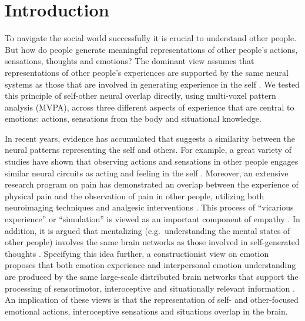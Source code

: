\documentclass[12pt,american,a4paper,oneside,]{memoir} %
\begin{document}
\hypertarget{Sharedstates-introduction}{%
\section{Introduction}\label{Sharedstates-introduction}}

To navigate the social world successfully it is crucial to understand other people. But how do people generate meaningful representations of other people's actions, sensations, thoughts and emotions? The dominant view assumes that representations of other people's experiences are supported by the same neural systems as those that are involved in generating experience in the self \autocites[e.g.,][]{gallese2004unifying}[see for an overview][]{singer2012past}. We tested this principle of self-other neural overlap directly, using multi-voxel pattern analysis (MVPA), across three different aspects of experience that are central to emotions: actions, sensations from the body and situational knowledge.

In recent years, evidence has accumulated that suggests a similarity between the neural patterns representing the self and others. For example, a great variety of studies have shown that observing actions and sensations in other people engages similar neural circuits as acting and feeling in the self \autocite[see for an overview][]{bastiaansen2009evidence}. Moreover, an extensive research program on pain has demonstrated an overlap between the experience of physical pain and the observation of pain in other people, utilizing both neuroimaging techniques \autocite[e.g.,][]{lamm2011meta} and analgesic interventions \autocites[e.g.,][]{rutgen2015placebo}{mischkowski2016painkiller}. This process of ``vicarious experience'' or ``simulation'' is viewed as an important component of empathy \autocite{carr2003neural,decety2011dissecting,keysers2014dissociating}. In addition, it is argued that mentalizing (e.g.~understanding the mental states of other people) involves the same brain networks as those involved in self-generated thoughts \autocite{uddin2007self,waytz2011two}. Specifying this idea further, a constructionist view on emotion proposes that both emotion experience and interpersonal emotion understanding are produced by the same large-scale distributed brain networks that support the processing of sensorimotor, interoceptive and situationally relevant information \autocite{barrett2013large,oosterwijk2014embodiment}. An implication of these views is that the representation of self- and other-focused emotional actions, interoceptive sensations and situations overlap in the brain.
\end{document}
